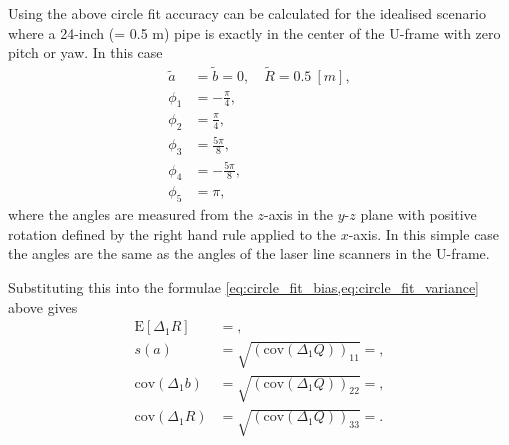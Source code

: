 Using the above circle fit accuracy can be calculated for the idealised scenario where a 24-inch (= 0.5 m) pipe is exactly in the center of the U-frame with zero pitch or yaw. In this case
\begin{align*}
    \tilde{a} & = \tilde{b} = 0, \quad \tilde{R} = 0.5 \ [m], \\
    \phi_1    & = -\frac{\pi}{4},                       \\
    \phi_2    & = \frac{\pi}{4},                        \\
    \phi_3    & =  \frac{5\pi}{8},                      \\
    \phi_4    & = -\frac{5\pi}{8},                      \\
    \phi_5    & = \pi,
\end{align*}
where the angles are measured from the $z$-axis in the $y$-$z$ plane with positive rotation defined by the right hand rule applied to the $x$-axis. In this simple case the angles are the same as the angles of the laser line scanners in the U-frame.

Substituting this into the formulae \cref{eq:circle_fit_bias,eq:circle_fit_variance} above gives
\begin{align*}
    \text{E}[\Delta_1 R]   & =,                                   \\
    s(a)  & = \sqrt{(\text{cov}(\Delta_1 Q))_{11}} = , \\
    \text{cov}(\Delta_1 b) & = \sqrt{(\text{cov}(\Delta_1 Q))_{22}} = , \\
    \text{cov}(\Delta_1 R) & = \sqrt{(\text{cov}(\Delta_1 Q))_{33}} = .
\end{align*}